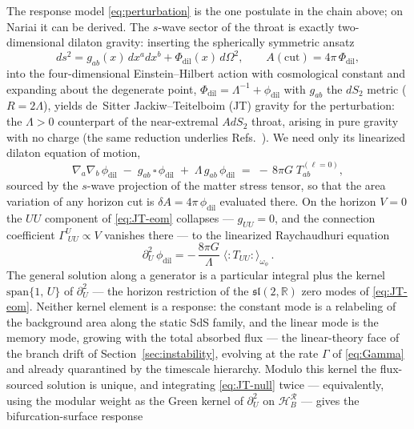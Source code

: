\documentclass[11pt]{article}
\newcommand{\Nariai}{Nariai}
\begin{document}
The response model \eqref{eq:perturbation} is the one postulate in the chain above; on \Nariai{} it can be derived. The $s$-wave sector of the throat is exactly two-dimensional dilaton gravity: inserting the spherically symmetric ansatz
\begin{equation}
ds^2 = g_{ab}(x)\, dx^a dx^b + \Phi_{\mathrm{dil}}(x)\, d\Omega^2,
\qquad
A(\mathrm{cut}) = 4\pi\, \Phi_{\mathrm{dil}},
\label{eq:JT-ansatz}
\end{equation}
into the four-dimensional Einstein--Hilbert action with cosmological constant and expanding about the degenerate point, $\Phi_{\mathrm{dil}} = \Lambda^{-1} + \phi_{\mathrm{dil}}$ with $g_{ab}$ the $dS_2$ metric ($R = 2\Lambda$), yields de~Sitter Jackiw--Teitelboim (JT) gravity for the perturbation: the $\Lambda > 0$ counterpart of the near-extremal $AdS_2$ throat, arising in pure gravity with no charge \cite{MertensTuriaci} (the same reduction underlies Refs.~\cite{FanarasVilenkin,Rusalev}). We need only its linearized dilaton equation of motion,
\begin{equation}
\nabla_a \nabla_b\, \phi_{\mathrm{dil}} \;-\; g_{ab}\,\square\, \phi_{\mathrm{dil}} \;+\; \Lambda\, g_{ab}\, \phi_{\mathrm{dil}}
\;=\; -\,8\pi G\; T^{(\ell=0)}_{ab},
\label{eq:JT-eom}
\end{equation}
sourced by the $s$-wave projection of the matter stress tensor, so that the area variation of any horizon cut is $\delta A = 4\pi\,\phi_{\mathrm{dil}}$ evaluated there. On the horizon $V = 0$ the $UU$ component of \eqref{eq:JT-eom} collapses --- $g_{UU} = 0$, and the connection coefficient $\Gamma^{U}_{\;UU} \propto V$ vanishes there --- to the linearized Raychaudhuri equation
\begin{equation}
\partial_U^2\, \phi_{\mathrm{dil}}
= -\,\frac{8\pi G}{\Lambda}\; \langle{:}T_{UU}{:}\rangle_{\omega_\phi}\,.
\label{eq:JT-null}
\end{equation}
The general solution along a generator is a particular integral plus the kernel $\mathrm{span}\{1,\, U\}$ of $\partial_U^2$ --- the horizon restriction of the $\mathfrak{sl}(2,\mathbb{R})$ zero modes of \eqref{eq:JT-eom}. Neither kernel element is a response: the constant mode is a relabeling of the background area along the static SdS family, and the linear mode is the memory mode, growing with the total absorbed flux --- the linear-theory face of the branch drift of Section~\ref{sec:instability}, evolving at the rate $\Gamma$ of \eqref{eq:Gamma} and already quarantined by the timescale hierarchy. Modulo this kernel the flux-sourced solution is unique, and integrating \eqref{eq:JT-null} twice --- equivalently, using the modular weight as the Green kernel of $\partial_U^2$ on $\mathcal{H}_B^{\mathcal{R}}$ --- gives the bifurcation-surface response
\end{document}
